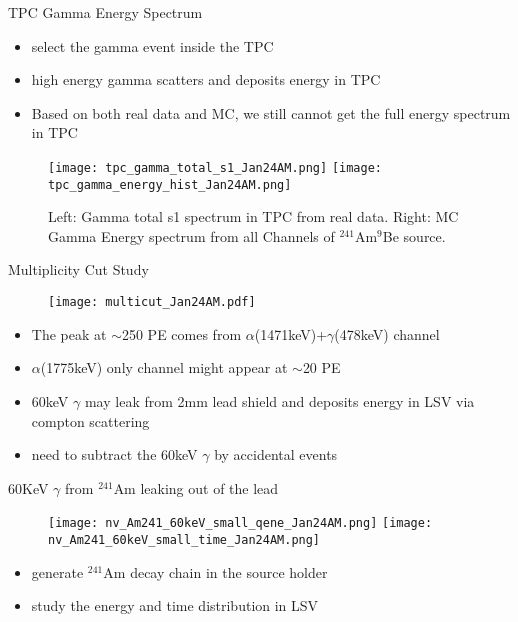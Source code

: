 \documentclass[9pt]{beamer}
\begin{document}
\begin{frame}{TPC Gamma Energy Spectrum}
\begin{itemize}
[bullet]
\item select the gamma event inside the TPC 
\item high energy gamma scatters and deposits energy in TPC
\item Based on both real data and MC, we still cannot get the full energy spectrum in TPC 
\end{itemize}
\begin{figure}
\texttt{[image: tpc\_gamma\_total\_s1\_Jan24AM.png]}
\texttt{[image: tpc\_gamma\_energy\_hist\_Jan24AM.png]}
\caption{Left: Gamma total s1 spectrum in TPC from real data. Right: MC Gamma Energy spectrum from all Channels  of $^{241}$Am$^9$Be source.}
\end{figure}
\end{frame}

\begin{frame}{Multiplicity Cut Study}
\begin{figure}
\texttt{[image: multicut\_Jan24AM.pdf]}
\end{figure}
\begin{itemize}
[bullet]
\item The peak at $\sim$250 PE comes from $\alpha$(1471keV)+$\gamma$(478keV) channel
\item $\alpha$(1775keV) only channel might appear at $\sim$20 PE 
\item 60keV $\gamma$ may leak from 2mm lead shield and deposits energy in LSV via compton scattering
\item need to subtract the 60keV $\gamma$ by accidental events 
\end{itemize}
\end{frame}

\begin{frame}{60KeV $\gamma$ from $^{241}$Am leaking out of the lead}
\begin{figure}
\texttt{[image: nv\_Am241\_60keV\_small\_qene\_Jan24AM.png]}
\texttt{[image: nv\_Am241\_60keV\_small\_time\_Jan24AM.png]}
\end{figure}
\begin{itemize}
[bullet]
\item generate $^{241}$Am decay chain in the source holder
\item study the energy and time distribution in LSV
\end{itemize}
\end{frame}
\end{document}
